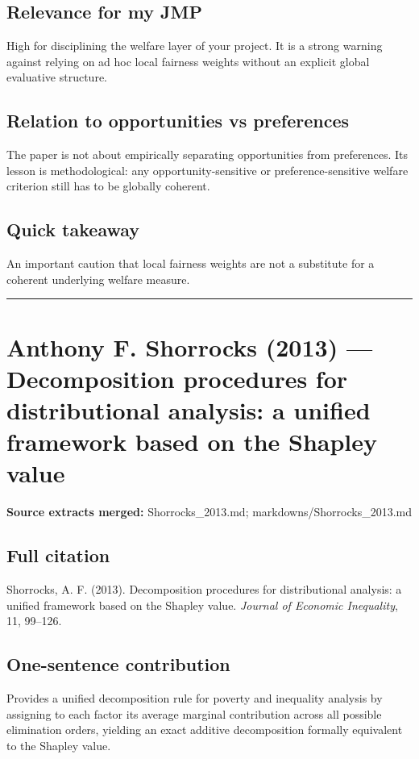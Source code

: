 \documentclass[11pt,a4paper]{article}
\begin{document}
\subsection*{Relevance for my JMP}
High for disciplining the welfare layer of your project. It is a strong warning against relying on ad hoc local fairness weights without an explicit global evaluative structure.

\subsection*{Relation to opportunities vs preferences}
The paper is not about empirically separating opportunities from preferences. Its lesson is methodological: any opportunity-sensitive or preference-sensitive welfare criterion still has to be globally coherent.

\subsection*{Quick takeaway}
An important caution that local fairness weights are not a substitute for a coherent underlying welfare measure.


\medskip\hrule\medskip

\section*{Anthony F. Shorrocks (2013) — Decomposition procedures for distributional analysis: a unified framework based on the Shapley value}

\textbf{Source extracts merged:} Shorrocks\_2013.md; markdowns/Shorrocks\_2013.md

\subsection*{Full citation}
Shorrocks, A. F. (2013). Decomposition procedures for distributional analysis: a unified framework based on the Shapley value. \textit{Journal of Economic Inequality}, 11, 99--126.

\subsection*{One-sentence contribution}
Provides a unified decomposition rule for poverty and inequality analysis by assigning to each factor its average marginal contribution across all possible elimination orders, yielding an exact additive decomposition formally equivalent to the Shapley value.
\end{document}

